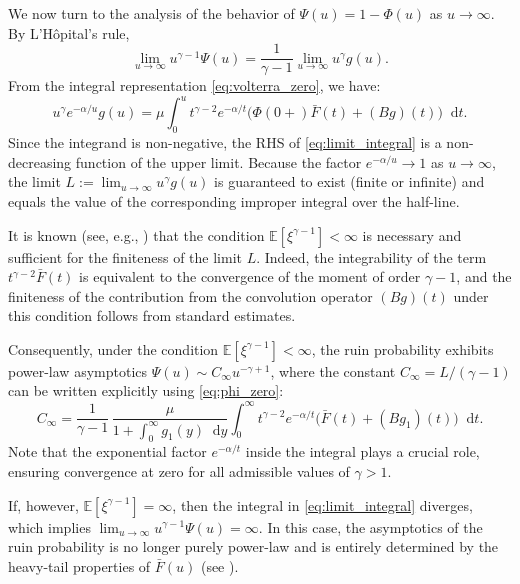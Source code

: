 \documentclass[smallextended]{svjour3}
\providecommand{\diff}{\mathop{}\!\mathrm{d}}
\begin{document}
We now turn to the analysis of the behavior of $\Psi(u) = 1 - \Phi(u)$ as $u \to \infty$. By L'Hôpital's rule,
\begin{equation*}%
\lim_{u\to\infty} u^{\gamma-1} \Psi(u) = \frac{1}{\gamma-1} \lim_{u\to\infty} u^\gamma g(u).
\end{equation*}
From the integral representation \eqref{eq:volterra_zero}, we have:
\begin{equation}\label{eq:limit_integral}
u^\gamma e^{-\alpha/u} g(u) = \mu \int_0^u t^{\gamma-2} e^{-\alpha/t} \big( \Phi(0+) \bar{F}(t) + (Bg)(t) \big) \diff t.
\end{equation}
Since the integrand is non-negative, the RHS of \eqref{eq:limit_integral} is a non-decreasing function of the upper limit. Because the factor $e^{-\alpha/u} \to 1$ as $u \to \infty$, the limit $L := \lim_{u\to\infty} u^\gamma g(u)$ is guaranteed to exist (finite or infinite) and equals the value of the corresponding improper integral over the half-line.

It is known (see, e.g., \cite{Frolova2002,Paulsen1993}) that the condition $\mathbb{E}[\xi^{\gamma-1}] < \infty$ is necessary and sufficient for the finiteness of the limit $L$. Indeed, the integrability of the term $t^{\gamma-2} \bar{F}(t)$ is equivalent to the convergence of the moment of order $\gamma-1$, and the finiteness of the contribution from the convolution operator $(Bg)(t)$ under this condition follows from standard estimates. 

Consequently, under the condition $\mathbb{E}[\xi^{\gamma-1}] < \infty$, the ruin probability exhibits power-law asymptotics $\Psi(u) \sim C_\infty u^{-\gamma+1}$, where the constant $C_\infty = L/(\gamma-1)$ can be written explicitly using \eqref{eq:phi_zero}:
\begin{equation}\label{eq:c_infty}
C_\infty = \frac{1}{\gamma-1}\, \frac{\mu}{1+\int_0^\infty g_1(y)\diff y} \int_0^\infty t^{\gamma-2} e^{-\alpha/t} \big( \bar{F}(t) + (Bg_1)(t) \big) \diff t.
\end{equation}
Note that the exponential factor $e^{-\alpha/t}$ inside the integral plays a crucial role, ensuring convergence at zero for all admissible values of $\gamma > 1$.

If, however, $\mathbb{E}[\xi^{\gamma-1}] = \infty$, then the integral in \eqref{eq:limit_integral} diverges, which implies $\lim_{u\to\infty} u^{\gamma-1}\Psi(u) = \infty$. In this case, the asymptotics of the ruin probability is no longer purely power-law and is entirely determined by the heavy-tail properties of $\bar{F}(u)$ (see \cite{Grandits2004}).
\end{document}
